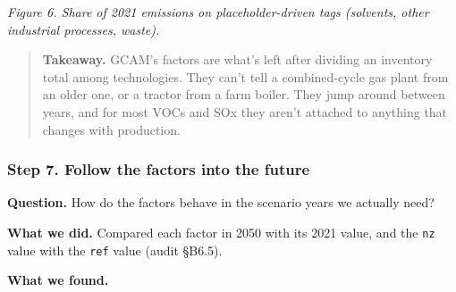 
\emph{Figure
6. Share
of 2021
emissions
on
placeholder-driven
tags
(solvents,
other
industrial
processes,
waste).}

\begin{quote}
\plainmark{}
\textbf{Takeaway.}
GCAM's
factors
are what's
left after
dividing
an
inventory
total
among
technologies.
They can't
tell a
combined-cycle
gas plant
from an
older one,
or a
tractor
from a
farm
boiler.
They jump
around
between
years, and
for most
VOCs and
SOx they
aren't
attached
to
anything
that
changes
with
production.
\end{quote}

\hypertarget{step-7.-follow-the-factors-into-the-future}{%
\subsubsection*{Step 7. Follow the factors into the future}\label{step-7.-follow-the-factors-into-the-future}}

\textbf{Question.}
How do the
factors
behave in
the
scenario
years we
actually
need?

\textbf{What
we did.}
Compared
each
factor in
2050 with
its 2021
value, and
the
\texttt{nz}
value with
the
\texttt{ref}
value
(audit
§B6.5).

\textbf{What
we found.}

